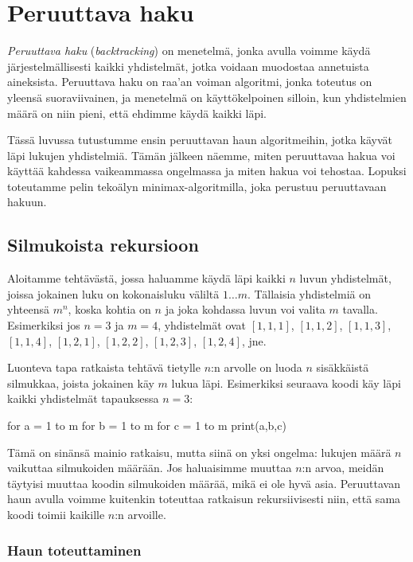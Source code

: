 \chapter{Peruuttava haku}

\emph{Peruuttava haku} (\emph{backtracking}) on menetelmä,
jonka avulla voimme käydä järjestelmällisesti kaikki yhdistelmät,
jotka voidaan muodostaa annetuista aineksista.
Peruuttava haku on raa'an voiman algoritmi,
jonka toteutus on yleensä suoraviivainen,
ja menetelmä on käyttökelpoinen silloin,
kun yhdistelmien määrä on niin pieni, että ehdimme käydä kaikki läpi.

Tässä luvussa tutustumme ensin peruuttavan haun algoritmeihin,
jotka käyvät läpi lukujen yhdistelmiä.
Tämän jälkeen näemme, miten peruuttavaa hakua voi käyttää
kahdessa vaikeammassa ongelmassa ja miten hakua voi tehostaa.
Lopuksi toteutamme pelin tekoälyn minimax-algoritmilla,
joka perustuu peruuttavaan hakuun.

\section{Silmukoista rekursioon}

Aloitamme tehtävästä,
jossa haluamme käydä läpi kaikki $n$ luvun yhdistelmät,
joissa jokainen luku on kokonaisluku väliltä $1 \dots m$.
Tällaisia yhdistelmiä on yhteensä $m^n$,
koska kohtia on $n$ ja joka kohdassa luvun voi valita $m$ tavalla.
Esimerkiksi jos $n=3$ ja $m=4$, yhdistelmät ovat
$[1,1,1]$, $[1,1,2]$, $[1,1,3]$, $[1,1,4]$, $[1,2,1]$,
$[1,2,2]$, $[1,2,3]$, $[1,2,4]$, jne.

Luonteva tapa ratkaista tehtävä tietylle $n$:n arvolle on
luoda $n$ sisäkkäistä silmukkaa, joista jokainen käy $m$ lukua läpi.
Esimerkiksi seuraava koodi käy läpi kaikki yhdistelmät
tapauksessa $n=3$:

\begin{code}
for a = 1 to m
    for b = 1 to m
        for c = 1 to m
            print(a,b,c)
\end{code}

Tämä on sinänsä mainio ratkaisu, mutta siinä on yksi ongelma:
lukujen määrä $n$ vaikuttaa silmukoiden määrään.
Jos haluaisimme muuttaa $n$:n arvoa, meidän täytyisi muuttaa
koodin silmukoiden määrää, mikä ei ole hyvä asia.
Peruuttavan haun avulla voimme kuitenkin toteuttaa ratkaisun
rekursiivisesti niin, että sama koodi toimii kaikille $n$:n arvoille.

\subsection{Haun toteuttaminen}

